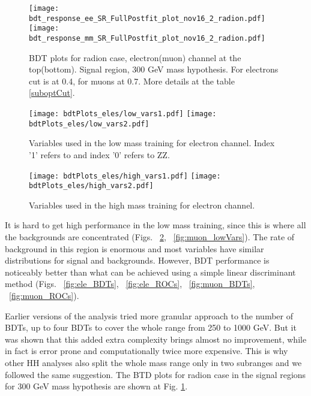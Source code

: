\begin{figure}[tbp]
  \begin{center}
   \texttt{[image: bdt\_response\_ee\_SR\_FullPostfit\_plot\_nov16\_2\_radion.pdf]}\\
   \texttt{[image: bdt\_response\_mm\_SR\_FullPostfit\_plot\_nov16\_2\_radion.pdf]}\\
    \caption{ BDT plots for radion case, electron(muon) channel at the top(bottom). Signal region, 300 GeV mass hypothesis. For electrons cut is at 0.4, for muons at 0.7. More details at the table \ref{suboptCut}.}
    \label{fig:BDTs}
  \end{center}
\end{figure}




\begin{figure}[tbp]
  \begin{center}
   \texttt{[image: bdtPlots\_eles/low\_vars1.pdf]}
   \texttt{[image: bdtPlots\_eles/low\_vars2.pdf]}
    \caption{ Variables used in the low mass training for electron channel. Index '1' refers to \bbbar and index '0' refers to ZZ.}
    \label{fig:ele_lowVars}
  \end{center}
\end{figure}



\begin{figure}[tbp]
  \begin{center}
   \texttt{[image: bdtPlots\_eles/high\_vars1.pdf]}
   \texttt{[image: bdtPlots\_eles/high\_vars2.pdf]}
    \caption{ Variables used in the high mass training for electron channel.}
    \label{fig:ele_highVars}
  \end{center}
\end{figure}


It is hard to get high performance in the low mass training, since
this is where all the backgrounds are concentrated (Figs. ~\ref{fig:ele_lowVars}, ~\ref{fig:muon_lowVars}). The rate of background in this region is enormous and most variables have similar distributions for signal and backgrounds. However, BDT performance is noticeably better than what can be achieved using a simple linear discriminant method (Figs. ~\ref{fig:ele_BDTs}, ~\ref{fig:ele_ROCs}, ~\ref{fig:muon_BDTs}, ~\ref{fig:muon_ROCs}). 

Earlier versions of the analysis tried more granular approach to the number of BDTs, up to four BDTs to cover the whole range from 250 to 1000 GeV. But it was shown that this added extra complexity brings almost no improvement, while in fact is error prone and computationally twice more expensive. This is why other HH analyses also split the whole mass range only in two subranges and we followed the same suggestion. The BTD plots for radion case in the signal regions for 300 GeV mass hypothesis are shown at Fig. \ref{fig:BDTs}.



